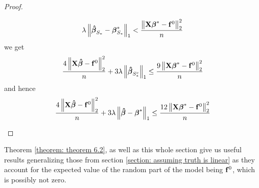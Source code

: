 \begin{proof}
\begin{enumerate}
              \[
                  \lambda\left\|\boldsymbol{\hat{\beta}}_{S_{*}}-\boldsymbol{\beta}_{S_{*}}^{*}\right\|_{1} < \frac{\left\|\mathbf{X} \boldsymbol{\beta}^{*}-\mathbf{f}^{0}\right\|_{2}^{2}}{n}
              \]
              we get
              \[
                  \frac{4\left\|\mathbf{X} \boldsymbol{\hat{\beta}}-\mathbf{f}^{0}\right\|_{2}^{2}}{n} + 3 \lambda\left\|\boldsymbol{\hat{\beta}}_{S_{*}^{c}}\right\|_{1} \leq \frac{9\left\|\mathbf{X} \boldsymbol{\beta}^{*}-\mathbf{f}^{0}\right\|_{2}^{2}}{n}
              \]
              and hence
              \[
                  \frac{4\left\|\mathbf{X} \boldsymbol{\hat{\beta}}-\mathbf{f}^{0}\right\|_{2}^{2}}{n} + 3 \lambda\left\|\boldsymbol{\hat{\beta}}-\boldsymbol{\beta}^{*}\right\|_{1} \leq \frac{12\left\|\mathbf{X} \boldsymbol{\beta}^{*}-\mathbf{f}^{0}\right\|_{2}^{2}}{n}
              \]
    \end{enumerate}
\end{proof}
Theorem \ref{theorem: theorem 6.2}, as well as this whole section give us useful results generalizing those from section \ref{section: assuming truth is linear} as they account for the expected value of the random part of the model being \(\mathbf{f}^0\), which is possibly not zero.
